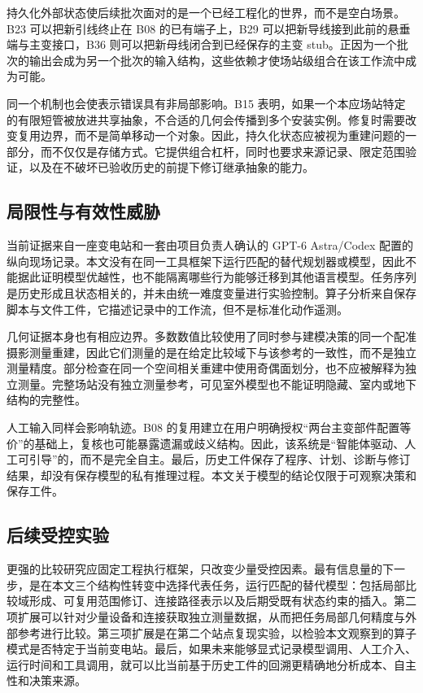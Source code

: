 \documentclass[10pt,a4paper]{article}
\begin{document}
持久化外部状态使后续批次面对的是一个已经工程化的世界，而不是空白场景。B23
可以把新引线终止在 B08 的已有端子上，B29
可以把新导线接到此前的悬垂端与主变接口，B36
则可以把新母线闭合到已经保存的主变
stub。正因为一个批次的输出会成为另一个批次的输入结构，这些依赖才使场站级组合在该工作流中成为可能。

同一个机制也会使表示错误具有非局部影响。B15
表明，如果一个本应场站特定的有限短管被放进共享抽象，不合适的几何会传播到多个安装实例。修复时需要改变复用边界，而不是简单移动一个对象。因此，持久化状态应被视为重建问题的一部分，而不仅仅是存储方式。它提供组合杠杆，同时也要求来源记录、限定范围验证，以及在不破坏已验收历史的前提下修订继承抽象的能力。

\hypertarget{ux5c40ux9650ux6027ux4e0eux6709ux6548ux6027ux5a01ux80c1}{%
\subsection{局限性与有效性威胁}\label{ux5c40ux9650ux6027ux4e0eux6709ux6548ux6027ux5a01ux80c1}}

当前证据来自一座变电站和一套由项目负责人确认的 GPT-6 Astra/Codex
配置的纵向现场记录。本文没有在同一工具框架下运行匹配的替代规划器或模型，因此不能据此证明模型优越性，也不能隔离哪些行为能够迁移到其他语言模型。任务序列是历史形成且状态相关的，并未由统一难度变量进行实验控制。算子分析来自保存脚本与文件工件，它描述记录中的工作流，但不是标准化动作遥测。

几何证据本身也有相应边界。多数数值比较使用了同时参与建模决策的同一个配准摄影测量重建，因此它们测量的是在给定比较域下与该参考的一致性，而不是独立测量精度。部分检查在同一个空间相关重建中使用奇偶面划分，也不应被解释为独立测量。完整场站没有独立测量参考，可见室外模型也不能证明隐藏、室内或地下结构的完整性。

人工输入同样会影响轨迹。B08
的复用建立在用户明确授权``两台主变部件配置等价''的基础上，复核也可能暴露遗漏或歧义结构。因此，该系统是``智能体驱动、人工可引导''的，而不是完全自主。最后，历史工件保存了程序、计划、诊断与修订结果，却没有保存模型的私有推理过程。本文关于模型的结论仅限于可观察决策和保存工件。

\hypertarget{ux540eux7eedux53d7ux63a7ux5b9eux9a8c}{%
\subsection{后续受控实验}\label{ux540eux7eedux53d7ux63a7ux5b9eux9a8c}}

更强的比较研究应固定工程执行框架，只改变少量受控因素。最有信息量的下一步，是在本文三个结构性转变中选择代表任务，运行匹配的替代模型：包括局部比较域形成、可复用范围修订、连接路径表示以及后期受既有状态约束的插入。第二项扩展可以针对少量设备和连接获取独立测量数据，从而把任务局部几何精度与外部参考进行比较。第三项扩展是在第二个站点复现实验，以检验本文观察到的算子模式是否特定于当前变电站。最后，如果未来能够显式记录模型调用、人工介入、运行时间和工具调用，就可以比当前基于历史工件的回溯更精确地分析成本、自主性和决策来源。
\end{document}
